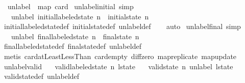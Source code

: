 \begin{isabellebody}
\ \ {\isachardoublequoteopen}unlabel\ {\isacharequal}\ map\ card{\isachardoublequoteclose}\isanewline
\isanewline
{}\isamarkupfalse%
\ unlabel{\isacharunderscore}initial\ {\isacharbrackleft}simp{\isacharbrackright}{\isacharcolon}\isanewline
\ \ \ {\isachardoublequoteopen}unlabel\ {\isacharparenleft}initial{\isacharunderscore}labeled{\isacharunderscore}state\ n{\isacharparenright}\ {\isacharequal}\ initial{\isacharunderscore}state\ n{\isachardoublequoteclose}\isanewline
%
\isadelimproof
\ \ %
\endisadelimproof
%
\isatagproof
{}\isamarkupfalse%
\ initial{\isacharunderscore}labeled{\isacharunderscore}state{\isacharunderscore}def\ initial{\isacharunderscore}state{\isacharunderscore}def\ unlabel{\isacharunderscore}def\isanewline
\ \ \isamarkupfalse%
\ auto%
\endisatagproof
{\isafoldproof}%
%
\isadelimproof
\isanewline
%
\endisadelimproof
\isanewline
{}\isamarkupfalse%
\ unlabel{\isacharunderscore}final\ {\isacharbrackleft}simp{\isacharbrackright}{\isacharcolon}\isanewline
\ \ \ {\isachardoublequoteopen}unlabel\ {\isacharparenleft}final{\isacharunderscore}labeled{\isacharunderscore}state\ n{\isacharparenright}\ {\isacharequal}\ final{\isacharunderscore}state\ n{\isachardoublequoteclose}\isanewline
%
\isadelimproof
\ \ %
\endisadelimproof
%
\isatagproof
{}\isamarkupfalse%
\ final{\isacharunderscore}labeled{\isacharunderscore}state{\isacharunderscore}def\ final{\isacharunderscore}state{\isacharunderscore}def\ unlabel{\isacharunderscore}def\isanewline
\ \ \isamarkupfalse%
\ {\isacharparenleft}metis\ card{\isacharunderscore}atLeastLessThan\ card{\isacharunderscore}empty\ diff{\isacharunderscore}zero\ map{\isacharunderscore}replicate\ map{\isacharunderscore}update{\isacharparenright}%
\endisatagproof
{\isafoldproof}%
%
\isadelimproof
\isanewline
%
\endisadelimproof
\isanewline
{}\isamarkupfalse%
\ unlabel{\isacharunderscore}valid{\isacharcolon}\isanewline
\ \ \ {\isachardoublequoteopen}valid{\isacharunderscore}labeled{\isacharunderscore}state\ n\ l{\isacharunderscore}state{\isachardoublequoteclose}\isanewline
\ \ \ {\isachardoublequoteopen}valid{\isacharunderscore}state\ n\ {\isacharparenleft}unlabel\ l{\isacharunderscore}state{\isacharparenright}{\isachardoublequoteclose}\isanewline
%
\isadelimproof
\ \ %
\endisadelimproof
%
\isatagproof
{}\isamarkupfalse%
\ valid{\isacharunderscore}state{\isacharunderscore}def\ unlabel{\isacharunderscore}def\isanewline
{}\isamarkupfalse%

\end{isabellebody}
